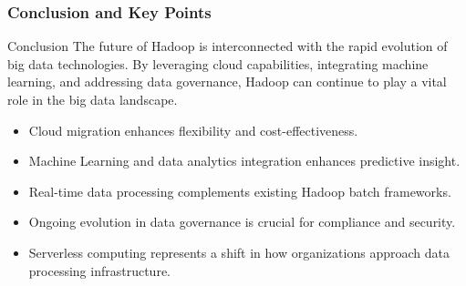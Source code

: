 \documentclass[aspectratio=169]{beamer}
\begin{document}
\begin{frame}[fragile]
    \frametitle{Conclusion and Key Points}
    \begin{block}{Conclusion}
        The future of Hadoop is interconnected with the rapid evolution of big data technologies. By leveraging cloud capabilities, integrating machine learning, and addressing data governance, Hadoop can continue to play a vital role in the big data landscape.
    \end{block}
    
    \begin{itemize}
        \item Cloud migration enhances flexibility and cost-effectiveness.
        \item Machine Learning and data analytics integration enhances predictive insight.
        \item Real-time data processing complements existing Hadoop batch frameworks.
        \item Ongoing evolution in data governance is crucial for compliance and security.
        \item Serverless computing represents a shift in how organizations approach data processing infrastructure.
    \end{itemize}
\end{frame}
\end{document}
